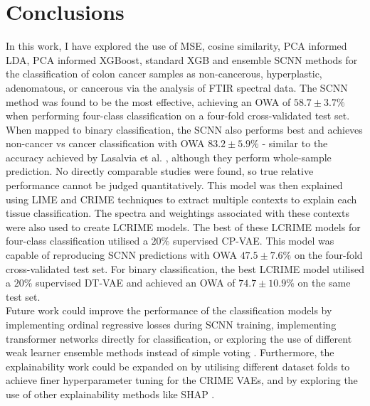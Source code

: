 \section{Conclusions}
In this work, I have explored the use of MSE, cosine similarity, PCA informed LDA, PCA informed XGBoost, standard XGB and ensemble SCNN methods for the classification of colon cancer samples as non-cancerous, hyperplastic, adenomatous, or cancerous via the analysis of FTIR spectral data. The SCNN method was found to be the most effective, achieving an OWA of $58.7\pm3.7\%$ when performing four-class classification on a four-fold cross-validated test set. When mapped to binary classification, the SCNN also performs best and achieves non-cancer vs cancer classification with OWA $83.2\pm5.9\%$ - similar to the accuracy achieved by Lasalvia et al. \cite{lasalvia_discrimination_2023}, although they perform whole-sample prediction. No directly comparable studies were found, so true relative performance cannot be judged quantitatively. This model was then explained using LIME and CRIME techniques to extract multiple contexts to explain each tissue classification. The spectra and weightings associated with these contexts were also used to create LCRIME models. The best of these LCRIME models for four-class classification utilised a $20\%$ supervised CP-VAE. This model was capable of reproducing SCNN predictions with OWA $47.5\pm7.6\%$ on the four-fold cross-validated test set. For binary classification, the best LCRIME model utilised a $20\%$ supervised DT-VAE and achieved an OWA of $74.7\pm 10.9\%$ on the same test set.\\ 

\noindent
Future work could improve the performance of the classification models by implementing ordinal regressive losses \cite{polat_class_2025,castagnos_simple_2022} during SCNN training, implementing transformer networks directly for classification, or exploring the use of different weak learner ensemble methods instead of simple voting \cite{zhou_ensemble_2009}. Furthermore, the explainability work could be expanded on by utilising different dataset folds to achieve finer hyperparameter tuning for the CRIME VAEs, and by exploring the use of other explainability methods like SHAP \cite{lundberg_unified_2017}.